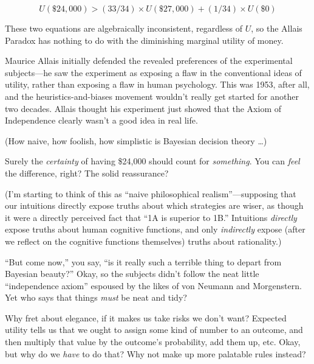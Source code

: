 \begin{equation*}
U(\$24,000) > (33/34) \times U(\$27,000) +
(1/34) \times U(\$0)
\end{equation*}



{
 These two equations are algebraically inconsistent, regardless of
$U$, so the Allais Paradox has nothing to do with the diminishing
marginal utility of money. }

{
 Maurice Allais initially defended the revealed preferences of the
experimental subjects---he saw the experiment as exposing a flaw in the
conventional ideas of utility, rather than exposing a flaw in human
psychology. This was 1953, after all, and the heuristics-and-biases
movement wouldn't really get started for another two
decades. Allais thought his experiment just showed that the Axiom of
Independence clearly wasn't a good idea in real life.}

{
 (How naive, how foolish, how simplistic is Bayesian decision
theory \ldots)}

{
 Surely the \textit{certainty} of having \$24,000 should count for
\textit{something}. You can \textit{feel} the difference, right? The
solid reassurance?}

{
 (I'm starting to think of this as
``naive philosophical
realism''---supposing that our intuitions directly
expose truths about which strategies are wiser, as though it were a
directly perceived fact that ``1A is superior to
1B.'' Intuitions \textit{directly} expose truths
about human cognitive functions, and only \textit{indirectly} expose
(after we reflect on the cognitive functions themselves) truths about
rationality.)}

{
 ``But come now,'' you say,
``is it really such a terrible thing to depart from
Bayesian beauty?'' Okay, so the subjects
didn't follow the neat little
``independence axiom'' espoused by
the likes of von Neumann and Morgenstern. Yet who says that things
\textit{must} be neat and tidy?}

{
 Why fret about elegance, if it makes us take risks we
don't want? Expected utility tells us that we ought to
assign some kind of number to an outcome, and then multiply that value
by the outcome's probability, add them up, etc. Okay,
but why do we \textit{have} to do that? Why not make up more palatable
rules instead?}

